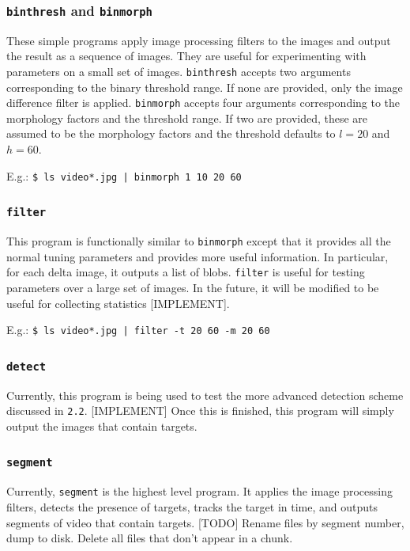 \documentclass[letter]{article}
\begin{document}
\subsubsection{\texttt{binthresh} and \texttt{binmorph}}
These simple programs apply image processing filters to the images and output the
result as a sequence of images. They are useful for experimenting with parameters 
on a small set of images. \texttt{binthresh} accepts two arguments corresponding
to the binary threshold range. If none are provided, only the image difference filter 
is applied. \texttt{binmorph} accepts four arguments  corresponding to the morphology 
factors and the threshold range. If two are provided, these are assumed to be the
morphology factors and the threshold defaults to $l=20$ and $h=60$. 

E.g.: \texttt{\$ ls video*.jpg | binmorph 1 10 20 60}

\subsubsection{\texttt{filter}}
This program is functionally similar to \texttt{binmorph} except that it provides all 
the normal tuning parameters and provides more useful information. In particular, for 
each delta image, it outputs a list of blobs. \texttt{filter} is useful for testing 
parameters over a large set of images. In the future, it will be modified to be useful
for collecting statistics [IMPLEMENT].  

E.g.: \texttt{\$ ls video*.jpg | filter -t 20 60 -m 20 60}

\subsubsection{\texttt{detect}}
Currently, this program is being used to test the more advanced detection scheme 
discussed in \texttt{2.2}. [IMPLEMENT] Once this is finished, this program will 
simply output the images that contain targets. 

\subsubsection{\texttt{segment}}
Currently, \texttt{segment} is the highest level program. It applies the image 
processing filters, detects the presence of targets, tracks the target in time, 
and outputs segments of video that contain targets. [TODO] Rename files by 
segment number, dump to disk. Delete all files that don't appear in a chunk. 
\end{document}
